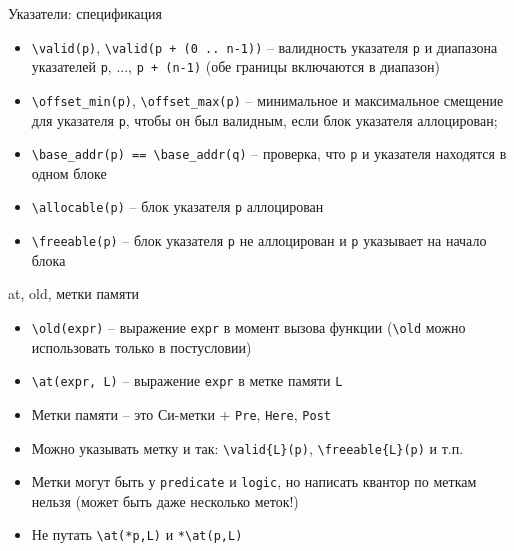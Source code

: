 \documentclass[hyperref={unicode=true}]{beamer}
\begin{document}
    \begin{frame}[fragile]{Указатели: спецификация}
    \begin{itemize}
    \item
    \verb|\valid(p)|, \verb|\valid(p + (0 .. n-1))| -- валидность
    указателя \verb|p| и диапазона указателей \verb|p|, ..., \verb|p + (n-1)|
    (обе границы включаются в диапазон)
    \item
    \verb|\offset_min(p)|, \verb|\offset_max(p)| -- минимальное
    и максимальное смещение для указателя \verb|p|, чтобы он был валидным,
    если блок указателя аллоцирован;
    \item
    \verb|\base_addr(p) == \base_addr(q)| -- проверка, что \verb|p|
    и указателя находятся в одном блоке
    \item
    \verb|\allocable(p)| -- блок указателя \verb|p| аллоцирован
    \item
    \verb|\freeable(p)| -- блок указателя \verb|p| не аллоцирован и \verb|p| указывает
    на начало блока
    \end{itemize}
    \end{frame}

    \begin{frame}[fragile]{at, old, метки памяти}
    \begin{itemize}
    \item
    \verb|\old(expr)| -- выражение \verb|expr| в момент вызова функции
    (\verb|\old| можно использовать только в постусловии)
    \item
    \verb|\at(expr, L)| -- выражение \verb|expr| в метке памяти \verb|L|
    \item
    Метки памяти -- это Си-метки + \verb|Pre|, \verb|Here|, \verb|Post|
    \item
    Можно указывать метку и так: \verb|\valid{L}(p)|, \verb|\freeable{L}(p)| и т.п.
    \item
    Метки могут быть у \verb|predicate| и \verb|logic|, но написать квантор по меткам нельзя
    (может быть даже несколько меток!)
    \item
    Не путать \verb|\at(*p,L)| и \verb|*\at(p,L)|
    \end{itemize}
    \end{frame}
\end{document}
